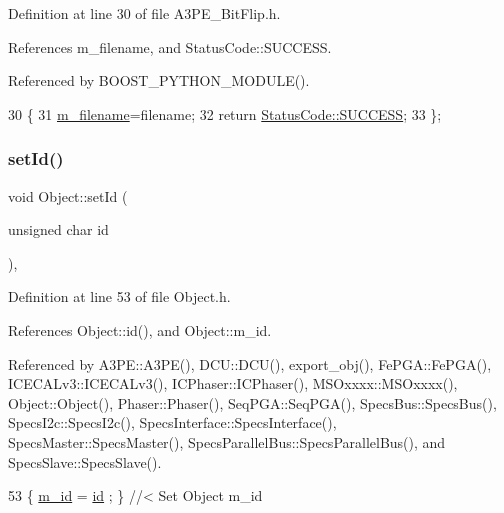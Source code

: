 Definition at line 30 of file A3\+P\+E\+\_\+\+Bit\+Flip.\+h.



References m\+\_\+filename, and Status\+Code\+::\+S\+U\+C\+C\+E\+SS.



Referenced by B\+O\+O\+S\+T\+\_\+\+P\+Y\+T\+H\+O\+N\+\_\+\+M\+O\+D\+U\+L\+E().


\begin{DoxyCode}
30                                          \{
31     \hyperlink{classA3PE__BitFlip_a72eecaff11d66c7f3eee10a9b2bfa301}{m\_filename}=filename;
32     \textcolor{keywordflow}{return} \hyperlink{classStatusCode_a6f565cbeadc76d14c72f047e5e85eb4badd0da38d3ba0d922efd1f4619bc37ad8}{StatusCode::SUCCESS};
33   \};
\end{DoxyCode}
\mbox{\label{classObject_a398fe08cba594a0ce6891d59fe4f159f}} 
\subsubsection{\texorpdfstring{set\+Id()}{setId()}}
{\footnotesize\ttfamily void Object\+::set\+Id (\begin{DoxyParamCaption}\item[{unsigned char}]{id }\end{DoxyParamCaption})\hspace{0.3cm}{\ttfamily [inline]}, {\ttfamily [inherited]}}



Definition at line 53 of file Object.\+h.



References Object\+::id(), and Object\+::m\+\_\+id.



Referenced by A3\+P\+E\+::\+A3\+P\+E(), D\+C\+U\+::\+D\+C\+U(), export\+\_\+obj(), Fe\+P\+G\+A\+::\+Fe\+P\+G\+A(), I\+C\+E\+C\+A\+Lv3\+::\+I\+C\+E\+C\+A\+Lv3(), I\+C\+Phaser\+::\+I\+C\+Phaser(), M\+S\+Oxxxx\+::\+M\+S\+Oxxxx(), Object\+::\+Object(), Phaser\+::\+Phaser(), Seq\+P\+G\+A\+::\+Seq\+P\+G\+A(), Specs\+Bus\+::\+Specs\+Bus(), Specs\+I2c\+::\+Specs\+I2c(), Specs\+Interface\+::\+Specs\+Interface(), Specs\+Master\+::\+Specs\+Master(), Specs\+Parallel\+Bus\+::\+Specs\+Parallel\+Bus(), and Specs\+Slave\+::\+Specs\+Slave().


\begin{DoxyCode}
53 \{ \hyperlink{classObject_aca74b9dbfed7b5556ea2d56c65b6b6b0}{m\_id}    = \hyperlink{classObject_af99145335cc61ff6e2798ea17db009d2}{id}    ; \} \textcolor{comment}{//< Set Object m\_id}
\end{DoxyCode}
\mbox{\label{classProcessus_a471833f89047aa9a7ff6200a31c17a1d}} 
